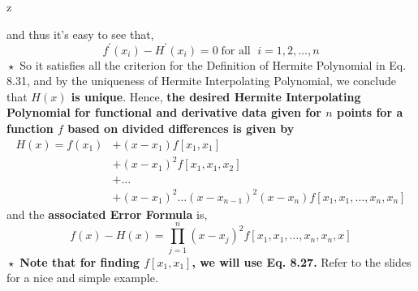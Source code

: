 z\documentclass[a4paper,12pt,twoside]{book}
\newcommand{\nll}[0]{\newline\newline}
\begin{document}
and thus it's easy to see that,
\[\boxed{f^\prime(x_i)-H^\prime(x_i) = 0 \;\text{for all }\;i=1,2,\dots,n}\]
$\boxed{\star}$ So it satisfies all the criterion for the Definition of Hermite Polynomial in Eq. 8.31, and by the uniqueness of Hermite Interpolating Polynomial, we conclude that \textbf{$H(x)$ is unique}. 
\nll
Hence, \textbf{the desired Hermite Interpolating Polynomial for functional and derivative data given for $n$ points for a function $f$ based on divided differences is given by}
\begin{equation}
    \begin{split}
        H(x) = f(x_1) &+ (x-x_1)f[x_1,x_1]\\
        &+ (x-x_1)^2f[x_1,x_1,x_2]\\
        &+ \dots\\
        &+ (x-x_1)^2\dots(x-x_{n-1})^2(x-x_n)f[x_1,x_1,\dots,x_n,x_n]
    \end{split}
\end{equation}
and the \textbf{associated Error Formula} is,
\begin{equation}
    \boxed{f(x) - H(x) = \prod_{j=1}^{n}(x-x_j)^2f[x_1,x_1,\dots,x_n,x_n,x]}
\end{equation}
$\boxed{\star}$ \textbf{Note that for finding $f[x_1,x_1]$, we will use Eq. 8.27.}
\nll
Refer to the slides for a nice and simple example.
\newpage
\end{document}
